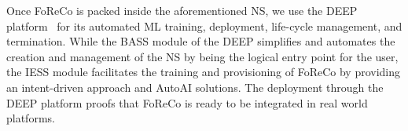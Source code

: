 \documentclass[a0,portrait]{a0poster}
\begin{document}
\begin{multicols}{2}
Once FoReCo is packed inside the
aforementioned NS,
we use the DEEP platform~\cite{deep} 
for its automated ML training, deployment,
life-cycle management, and termination. While the BASS module of the DEEP simplifies and automates the creation and management of the  NS by being the logical entry point for the user, the IESS module facilitates the training and provisioning of FoReCo by providing an intent-driven approach and AutoAI solutions. The deployment through
the DEEP platform proofs that FoReCo
is ready to be integrated in real
world platforms.








\end{multicols}
\end{document}
